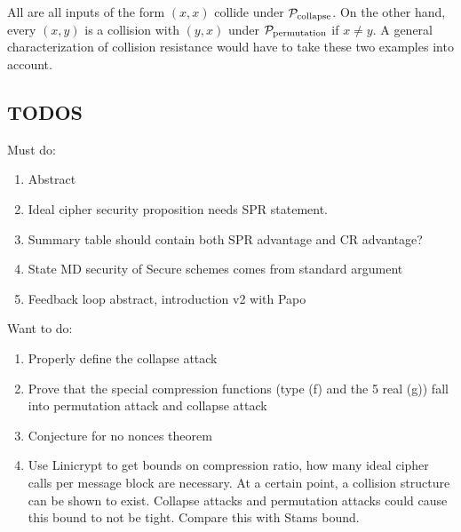 All are all inputs of the form $(x,x)$ collide under $\P_{\mathrm{collapse}}$.
On the other hand, every $(x,y)$ is a collision with $(y,x)$ under $\P_{\mathrm{permutation}}$ if $x \neq y$.
A general characterization of collision resistance would have to take these two examples into account.

\pagebreak

\subsection{TODOS}

Must do:
\begin{enumerate}
\item Abstract
\item Ideal cipher security proposition needs SPR statement.
\item Summary table should contain both SPR advantage and CR advantage?
\item State MD security of Secure schemes comes from standard argument
\item Feedback loop abstract, introduction v2 with Papo
\end{enumerate}

Want to do:
\begin{enumerate}
\item Properly define the collapse attack
\item Prove that the special compression functions (type (f) and the 5 real (g)) fall into permutation attack and collapse attack
\item Conjecture for no nonces theorem
\item Use Linicrypt to get bounds on compression ratio, how many ideal cipher calls per message block are necessary.
At a certain point, a collision structure can be shown to exist.
Collapse attacks and permutation attacks could cause this bound to not be tight.
Compare this with Stams bound.
\end{enumerate}
